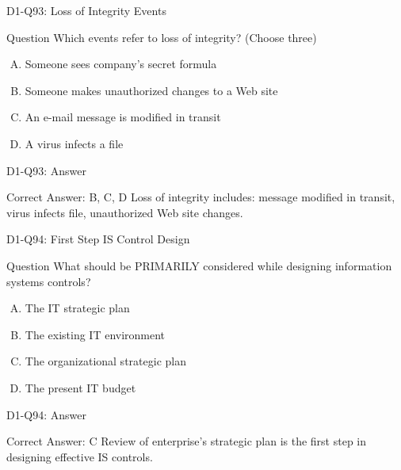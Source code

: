 \documentclass{beamer}
\begin{document}
	\begin{frame}{D1-Q93: Loss of Integrity Events}
		\begin{block}{Question}
			Which events refer to loss of integrity? (Choose three)
		\end{block}
		\begin{enumerate}[(A)]
			\item Someone sees company's secret formula
			\item Someone makes unauthorized changes to a Web site
			\item An e-mail message is modified in transit
			\item A virus infects a file
		\end{enumerate}
	\end{frame}
	\begin{frame}{D1-Q93: Answer}
		\begin{block}{Correct Answer: B, C, D}
			Loss of integrity includes: message modified in transit, virus infects file, unauthorized Web site changes.
		\end{block}
	\end{frame}
	
	\begin{frame}{D1-Q94: First Step IS Control Design}
		\begin{block}{Question}
			What should be PRIMARILY considered while designing information systems controls?
		\end{block}
		\begin{enumerate}[(A)]
			\item The IT strategic plan
			\item The existing IT environment
			\item The organizational strategic plan
			\item The present IT budget
		\end{enumerate}
	\end{frame}
	\begin{frame}{D1-Q94: Answer}
		\begin{block}{Correct Answer: C}
			Review of enterprise's strategic plan is the first step in designing effective IS controls.
		\end{block}
	\end{frame}
	
\end{document}
